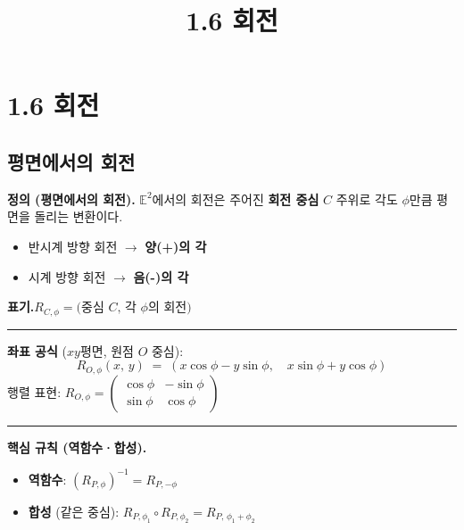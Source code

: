 \documentclass{article}
\title{1.6 회전}
\date{}
\author{}
\begin{document}
\maketitle

\section*{1.6 회전}

\subsection*{평면에서의 회전}

\begin{tcolorbox}[
  colback=teal!4, colframe=teal!65!black,
  title=정의 \& 핵심 규칙,
  fonttitle=\bfseries, boxrule=0.5mm, arc=3mm]

\textbf{\textcolor{teal!65!black}{정의 (평면에서의 회전).}}\quad
$\mathbb{E}^2$에서의 회전은 주어진 \textbf{회전 중심} $C$ 주위로 각도 $\phi$만큼 평면을 돌리는 변환이다.
\begin{itemize}\setlength\itemsep{0pt}
  \item 반시계 방향 회전 $\to$ \textbf{양(+)의 각}
  \item 시계 방향 회전 $\to$ \textbf{음(-)의 각}
\end{itemize}
\textbf{표기.}\quad $R_{C,\phi} = \text{(중심 $C$, 각 $\phi$의 회전)}$

\noindent\textcolor{teal!50!black}{\rule{\linewidth}{0.4pt}}

\textbf{\textcolor{teal!65!black}{좌표 공식}} ($xy$평면, 원점 $O$ 중심):
\[
  R_{O,\phi}(x,\,y) \;=\; (x\cos\phi - y\sin\phi,\quad x\sin\phi + y\cos\phi)
\]
행렬 표현:
$R_{O,\phi} = \begin{pmatrix}\cos\phi & -\sin\phi \\ \sin\phi & \cos\phi\end{pmatrix}$

\noindent\textcolor{teal!50!black}{\rule{\linewidth}{0.4pt}}

\textbf{\textcolor{teal!65!black}{핵심 규칙 (역함수·합성).}}
\begin{itemize}\setlength\itemsep{2pt}
  \item \textbf{역함수}: $(R_{P,\phi})^{-1} = R_{P,-\phi}$
  \item \textbf{합성} (같은 중심): $R_{P,\phi_1} \circ R_{P,\phi_2} = R_{P,\,\phi_1+\phi_2}$
\end{itemize}

\end{tcolorbox}
\end{document}
